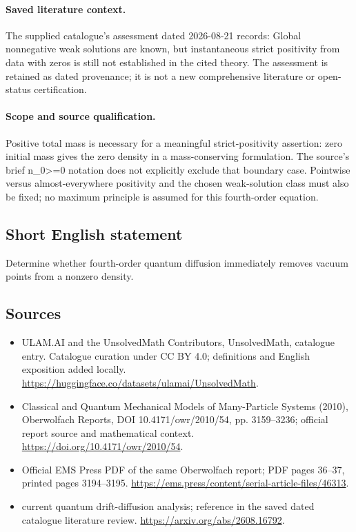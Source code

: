 \documentclass[11pt]{article}
\begin{document}
\paragraph{Saved literature context.} The supplied catalogue's assessment dated 2026-08-21 records: Global nonnegative weak solutions are known, but instantaneous strict positivity from data with zeros is still not established in the cited theory. The assessment is retained as dated provenance; it is not a new comprehensive literature or open-status certification.
\paragraph{Scope and source qualification.}Positive total mass is necessary for a meaningful strict-positivity assertion: zero initial mass gives the zero density in a mass-conserving formulation. The source's brief n_0>=0 notation does not explicitly exclude that boundary case. Pointwise versus almost-everywhere positivity and the chosen weak-solution class must also be fixed; no maximum principle is assumed for this fourth-order equation.
\subsection{Short English statement}
Determine whether fourth-order quantum diffusion immediately removes vacuum points from a nonzero density.
\subsection{Sources}
\begin{itemize}
\item[\hypertarget{source:statement:1}{S1}] ULAM.AI and the UnsolvedMath Contributors, UnsolvedMath, catalogue entry. Catalogue curation under CC BY 4.0; definitions and English exposition added locally.
\url{https://huggingface.co/datasets/ulamai/UnsolvedMath}.
\item[\hypertarget{source:statement:2}{S2}] Classical and Quantum Mechanical Models of Many-Particle Systems (2010), Oberwolfach Reports, DOI 10.4171/owr/2010/54, pp. 3159--3236; official report source and mathematical context.
\url{https://doi.org/10.4171/owr/2010/54}.
\item[\hypertarget{source:statement:3}{S3}] Official EMS Press PDF of the same Oberwolfach report; PDF pages 36--37, printed pages 3194--3195.
\url{https://ems.press/content/serial-article-files/46313}.
\item[\hypertarget{source:statement:4}{S4}] current quantum drift-diffusion analysis; reference in the saved dated catalogue literature review.
\url{https://arxiv.org/abs/2608.16792}.
\end{itemize}
\label{end:statement}
\end{document}
